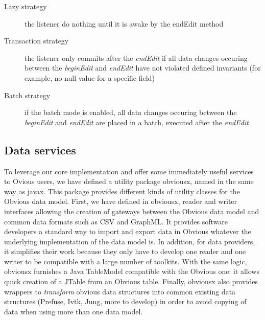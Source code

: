 \begin{description}
\item[Lazy strategy] the listener do nothing until it is awake by the endEdit method
\item[Transaction strategy] the listener only commits after the \emph{endEdit} if all data changes occuring between the \emph{beginEdit} and \emph{endEdit} have not violated defined invariants (for example, no null value for a specific field)
\item[Batch strategy] if the batch mode is enabled, all data changes occuring between the \emph{beginEdit} and \emph{endEdit} are placed in a batch, executed after the \emph{endEdit}
\end{description}

\subsection{Data services}

To leverage our core implementation and offer some immediately useful services to Ovious users, we have defined a utility package obviousx, named in the same way as javax. This package provides different kinds of utility classes for the Obvious data model. First, we have defined in obviousx, reader and writer interfaces allowing the creation of gateways between the Obvious data model and common data formats such as CSV and GraphML. It provides software developers a standard way to import and export data in Obvious whatever the underlying implementation of the data model is. In addition, for data providers, it simplifies their work because they only have to develop one reader and one writer to be compatible with a large number of toolkits. With the same logic, obviousx furnishes a Java TableModel compatible with the Obvious one: it allows quick creation of a JTable from an Obvious
table. Finally, obviousx also provides wrappers to \emph{transform} obvious data structures into common existing data structures (Prefuse, Ivtk, Jung, more to develop) in order to avoid copying of data when using more than one data model.
